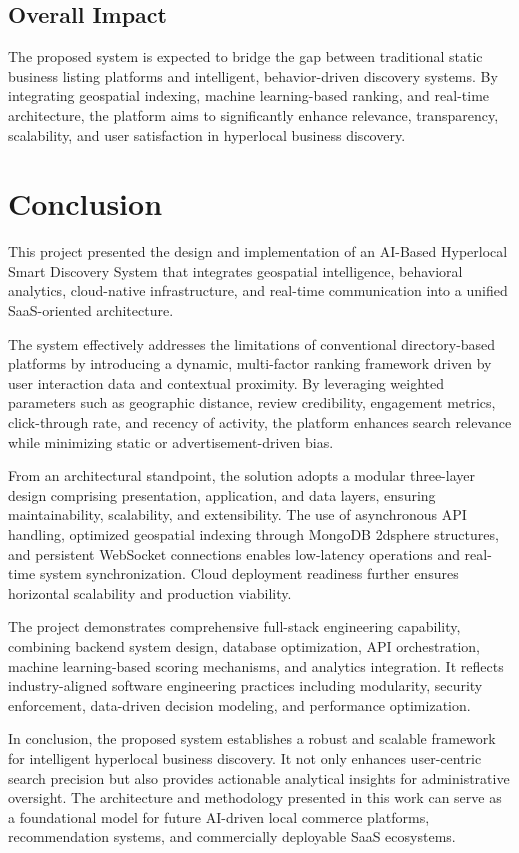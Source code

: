 \documentclass[12pt,a4paper]{report}
\begin{document}
\section{Overall Impact}

The proposed system is expected to bridge the gap between traditional static business listing platforms and intelligent, behavior-driven discovery systems. By integrating geospatial indexing, machine learning-based ranking, and real-time architecture, the platform aims to significantly enhance relevance, transparency, scalability, and user satisfaction in hyperlocal business discovery.


\chapter{Conclusion}

This project presented the design and implementation of an AI-Based Hyperlocal Smart Discovery System that integrates geospatial intelligence, behavioral analytics, cloud-native infrastructure, and real-time communication into a unified SaaS-oriented architecture.

The system effectively addresses the limitations of conventional directory-based platforms by introducing a dynamic, multi-factor ranking framework driven by user interaction data and contextual proximity. By leveraging weighted parameters such as geographic distance, review credibility, engagement metrics, click-through rate, and recency of activity, the platform enhances search relevance while minimizing static or advertisement-driven bias.

From an architectural standpoint, the solution adopts a modular three-layer design comprising presentation, application, and data layers, ensuring maintainability, scalability, and extensibility. The use of asynchronous API handling, optimized geospatial indexing through MongoDB 2dsphere structures, and persistent WebSocket connections enables low-latency operations and real-time system synchronization. Cloud deployment readiness further ensures horizontal scalability and production viability.

The project demonstrates comprehensive full-stack engineering capability, combining backend system design, database optimization, API orchestration, machine learning-based scoring mechanisms, and analytics integration. It reflects industry-aligned software engineering practices including modularity, security enforcement, data-driven decision modeling, and performance optimization.

In conclusion, the proposed system establishes a robust and scalable framework for intelligent hyperlocal business discovery. It not only enhances user-centric search precision but also provides actionable analytical insights for administrative oversight. The architecture and methodology presented in this work can serve as a foundational model for future AI-driven local commerce platforms, recommendation systems, and commercially deployable SaaS ecosystems.
\end{document}
